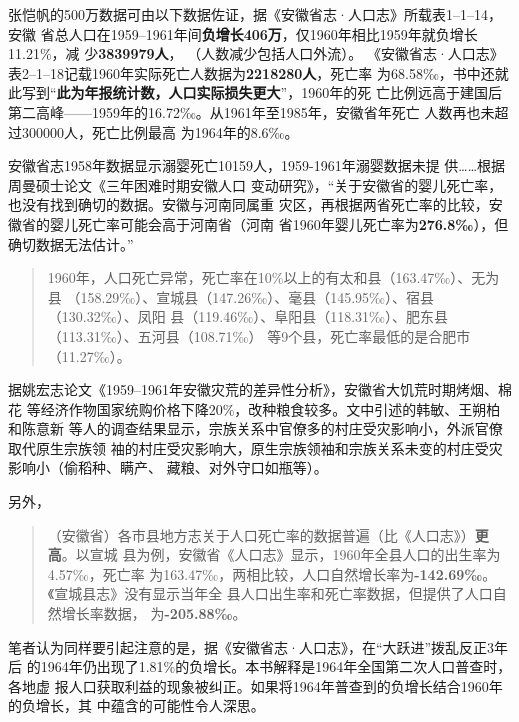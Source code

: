 张恺帆的500万数据可由以下数据佐证，据《安徽省志·人口志》所载表1--1--14，安徽
省总人口在1959--1961年间\textbf{负增长406万}，仅1960年相比1959年就负增长11.21\%，减
少\textbf{3839979人}， （人数减少包括人口外流）。
《安徽省志·人口志》表2--1--18记载1960年实际死亡人数据为\textbf{2218280人}，死亡率
为68.58‰，书中还就此写到“\textbf{此为年报统计数，人口实际损失更大}”，1960年的死
亡比例远高于建国后第二高峰——1959年的16.72‰。从1961年至1985年，安徽省年死亡
人数再也未超过300000人，死亡比例最高
为1964年的8.6‰。

安徽省志1958年数据显示溺婴死亡10159人，1959-1961年溺婴数据未提
供……根据周曼硕士论文《三年困难时期安徽人口
变动研究》，“关于安徽省的婴儿死亡率，也没有找到确切的数据。安徽与河南同属重
灾区，再根据两省死亡率的比较，安徽省的婴儿死亡率可能会高于河南省（河南
省1960年婴儿死亡率为\textbf{276.8‰}），但确切数据无法估计。”

\begin{quotation}
  1960年，人口死亡异常，死亡率在10\%以上的有太和县（163.47‰）、无为县
  （158.29‰）、宣城县（147.26‰）、毫县（145.95‰）、宿县（130.32‰）、凤阳
  县（119.46‰）、阜阳县（118.31‰）、肥东县（113.31‰）、五河县（108.71‰）
  等9个县，死亡率最低的是合肥市（11.27‰）。
\end{quotation}

据姚宏志论文《1959--1961年安徽灾荒的差异性分析》，安徽省大饥荒时期烤烟、棉花
等经济作物国家统购价格下降20\%，改种粮食较多。文中引述的韩敏、王朔柏和陈意新
等人的调查结果显示，宗族关系中官僚多的村庄受灾影响小，外派官僚取代原生宗族领
袖的村庄受灾影响大，原生宗族领袖和宗族关系未变的村庄受灾影响小（偷稻种、瞒产、
藏粮、对外守口如瓶等）。

另外，
\begin{quotation}
  （安徽省）各市县地方志关于人口死亡率的数据普遍（比《人口志》）\textbf{更高}。以宣城
  县为例，安徽省《人口志》显示，1960年全县人口的出生率为4.57‰，死亡率
  为163.47‰，两相比较，人口自然增长率为\textbf{-142.69‰}。《宣城县志》没有显示当年全
  县人口出生率和死亡率数据，但提供了人口自然增长率数据，
  为\textbf{-205.88‰}。\cite{zaihuangchayixing}
\end{quotation}


笔者认为同样要引起注意的是，据《安徽省志·人口志》，在“大跃进”拨乱反正3年后
的1964年仍出现了1.81\%的负增长。本书解释是1964年全国第二次人口普查时，各地虚
报人口获取利益的现象被纠正。如果将1964年普查到的负增长结合1960年的负增长，其
中蕴含的可能性令人深思。

